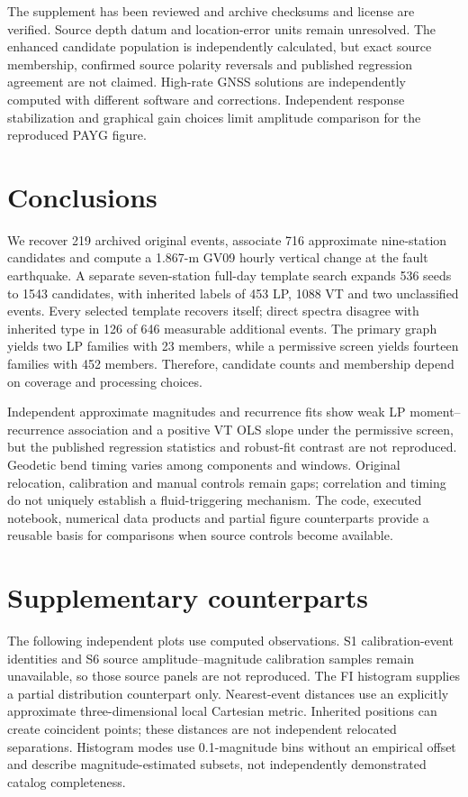 \documentclass[11pt]{article}
\begin{document}
The supplement has been reviewed and archive checksums and license are verified. Source depth datum and location-error units remain unresolved. The enhanced candidate population is independently calculated, but exact source membership, confirmed source polarity reversals and published regression agreement are not claimed. High-rate GNSS solutions are independently computed with different software and corrections. Independent response stabilization and graphical gain choices limit amplitude comparison for the reproduced PAYG figure.

\section{Conclusions}
We recover 219 archived original events, associate 716 approximate nine-station candidates and compute a 1.867-m GV09 hourly vertical change at the fault earthquake. A separate seven-station full-day template search expands 536 seeds to 1543 candidates, with inherited labels of 453 LP, 1088 VT and two unclassified events. Every selected template recovers itself; direct spectra disagree with inherited type in 126 of 646 measurable additional events. The primary graph yields two LP families with 23 members, while a permissive screen yields fourteen families with 452 members. Therefore, candidate counts and membership depend on coverage and processing choices.

Independent approximate magnitudes and recurrence fits show weak LP moment--recurrence association and a positive VT OLS slope under the permissive screen, but the published regression statistics and robust-fit contrast are not reproduced. Geodetic bend timing varies among components and windows. Original relocation, calibration and manual controls remain gaps; correlation and timing do not uniquely establish a fluid-triggering mechanism. The code, executed notebook, numerical data products and partial figure counterparts provide a reusable basis for comparisons when source controls become available.

\appendix
\section{Supplementary counterparts}
The following independent plots use computed observations. S1 calibration-event identities and S6 source amplitude--magnitude calibration samples remain unavailable, so those source panels are not reproduced. The FI histogram supplies a partial distribution counterpart only. Nearest-event distances use an explicitly approximate three-dimensional local Cartesian metric. Inherited positions can create coincident points; these distances are not independent relocated separations. Histogram modes use 0.1-magnitude bins without an empirical offset and describe magnitude-estimated subsets, not independently demonstrated catalog completeness.
\end{document}
